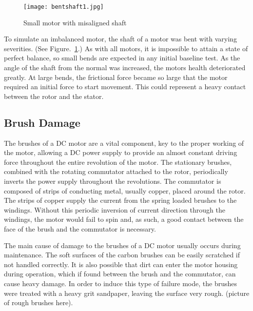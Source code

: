 \begin{figure}
    \centering
    \texttt{[image: bentshaft1.jpg]}
    \caption[Misaligned Motor Shaft]{Small motor with misaligned shaft}
    \label{fig:bentshaft}
\end{figure}

To simulate an imbalanced motor, the shaft of a motor was bent with varying severities. (See Figure.~\ref{fig:bentshaft}.) As with all motors, it is impossible to attain a state of perfect balance, so small bends are expected in any initial baseline test. As the angle of the shaft from the normal was increased, the motors health deteriorated greatly. At large bends, the frictional force became so large that the motor required an initial force to start movement. This could represent a heavy contact between the rotor and the stator. 


\subsection{Brush Damage}
The brushes of a DC motor are a vital component, key to the proper working of the motor, allowing a DC power supply to provide an almost constant driving force throughout the entire revolution of the motor. The stationary brushes, combined with the rotating commutator attached to the rotor, periodically inverts the power supply throughout the revolutions. The commutator is composed of strips of conducting metal, usually copper, placed around the rotor. The strips of copper supply the current from the spring loaded brushes to the windings.  Without this periodic inversion of current direction through the windings, the motor would fail to spin and, as such, a good contact between the face of the brush and the commutator is necessary. 

The main cause of damage to the brushes of a DC motor usually occurs during maintenance. The soft surfaces of the carbon brushes can be easily scratched if not handled correctly. It is also possible that dirt can enter the motor housing during operation, which if found between the brush and the commutator, can cause heavy damage. In order to induce this type of failure mode, the brushes were treated with a heavy grit sandpaper, leaving the surface very rough. (picture of rough brushes here). 


